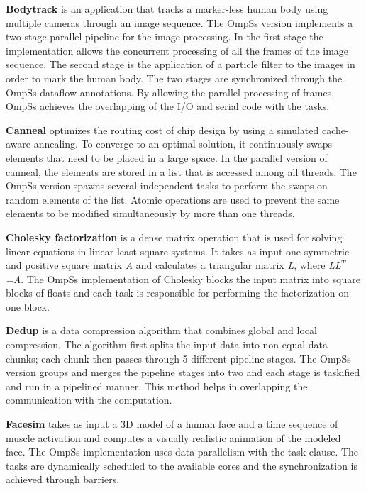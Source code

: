 \textbf{Bodytrack} is an application that tracks a marker-less human body using multiple cameras through an image sequence. 
The OmpSs version implements a two-stage parallel pipeline for the image processing.
In the first stage the implementation allows the concurrent processing of all the frames of the image sequence. 
The second stage is the application of a particle filter to the images in order to mark the human body.
The two stages are synchronized through the OmpSs dataflow annotations.
By allowing the parallel processing of frames, OmpSs achieves the overlapping of the I/O and serial code with the tasks. 

\textbf{Canneal} optimizes the routing cost of chip design by using a simulated cache-aware annealing. 
To converge to an optimal solution, it continuously swaps elements that need to be placed in a large space. 
In the parallel version of canneal, the elements are stored in a list that is accessed among all threads.
The OmpSs version spawns several independent tasks to perform the swaps on random elements of the list.
Atomic operations are used to prevent the same elements to be modified simultaneously by more than one threads.

\textbf{Cholesky factorization} is a dense matrix operation that is used for solving linear equations in linear least square systems.
It takes as input one symmetric and positive square matrix \textit{A} and calculates a triangular matrix \textit{L}, where \textit{LL}$^T$\textit{=A}.
The OmpSs implementation of Cholesky blocks the input matrix into square blocks of floats and each task is responsible for performing the factorization on one block.

\textbf{Dedup} is a data compression algorithm that combines global and local compression. 
The algorithm first splits the input data into non-equal data chunks; each chunk then passes through 5 different pipeline stages. 
The OmpSs version groups and merges the pipeline stages into two and each stage is taskified and run in a pipelined manner.
This method helps in overlapping the communication with the computation.

\textbf{Facesim} takes as input a 3D model of a human face and a time sequence of muscle activation and computes a visually realistic animation of the modeled face. 
The OmpSs implementation uses data parallelism with the task clause. 
The tasks are dynamically scheduled to the available cores and the synchronization is achieved through barriers.


